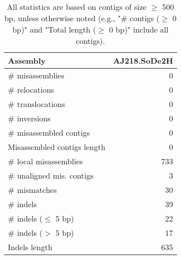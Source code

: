 \documentclass[12pt,a4paper]{article}
\begin{document}
\begin{table}[ht]
\begin{center}
\caption{All statistics are based on contigs of size $\geq$ 500 bp, unless otherwise noted (e.g., "\# contigs ($\geq$ 0 bp)" and "Total length ($\geq$ 0 bp)" include all contigs).}
\begin{tabular}{|l*{1}{|r}|}
\hline
Assembly & AJ218.SoDe2H \\ \hline
\# misassemblies & 0 \\ \hline
\hspace{5mm}\# relocations & 0 \\ \hline
\hspace{5mm}\# translocations & 0 \\ \hline
\hspace{5mm}\# inversions & 0 \\ \hline
\# misassembled contigs & 0 \\ \hline
Misassembled contigs length & 0 \\ \hline
\# local misassemblies & 733 \\ \hline
\# unaligned mis. contigs & 3 \\ \hline
\# mismatches & 30 \\ \hline
\# indels & 39 \\ \hline
\hspace{5mm}\# indels ($\leq$ 5 bp) & 22 \\ \hline
\hspace{5mm}\# indels ($>$ 5 bp) & 17 \\ \hline
Indels length & 635 \\ \hline
\end{tabular}
\end{center}
\end{table}
\end{document}
